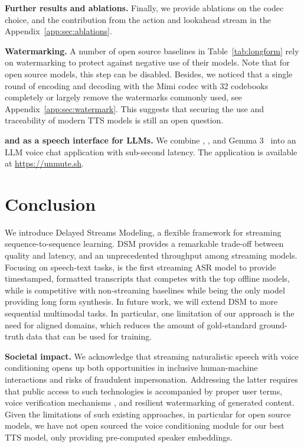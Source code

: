 \documentclass{article}
\begin{document}
\textbf{Further results and ablations.}  Finally, we provide ablations on the codec choice, and the contribution from the action and lookahead stream in the Appendix~\ref{app:sec:ablations}.


\textbf{Watermarking.} A number of open source baselines in Table~\ref{tab:longform} rely on watermarking to protect against negative use of their models. Note that for open source models, this step can be disabled. Besides, we noticed that a single round of encoding and decoding with the Mimi codec with 32 codebooks completely or largely remove the watermarks commonly used, see Appendix~\ref{app:sec:watermark}. This suggests that securing the use and traceability of modern TTS models is still an open question.  

\textbf{\oursASR{} and \oursTTS{} as a speech interface for LLMs.} We combine \oursASR{}, \oursTTS{}, and Gemma 3~\citep{gemmateam2025gemma3technicalreport} into an LLM voice chat application with sub-second latency. The application is available at \url{https://unmute.sh}.

\section{Conclusion}
We introduce Delayed Streams Modeling, a flexible framework for streaming sequence-to-sequence learning. DSM provides a remarkable trade-off between quality and latency, and an unprecedented throughput among streaming models. Focusing on speech-text tasks, \oursASR{} is the first streaming ASR model to provide timestamped, formatted transcripts that competes with the top offline models, while \oursTTS{} is competitive with non-streaming baselines while being the only model providing long form synthesis. In future work, we will extend DSM to more sequential multimodal tasks. 
In particular, one limitation of our approach is the need for aligned domains, which reduces the amount of gold-standard ground-truth data that can be used for training. 

\textbf{Societal impact.} We acknowledge that streaming naturalistic speech with voice conditioning opens up both opportunities in inclusive human-machine interactions and risks of fraudulent impersonation. Addressing the latter requires that public access to such technologies is accompanied by proper user terms, voice verification mechanisms 
, and resilient watermarking of generated content. Given the limitations of such existing approaches, in particular for open source models, we have not open sourced the voice conditioning module for our best TTS model, only providing pre-computed speaker embeddings.



\clearpage


\clearpage

\end{document}
